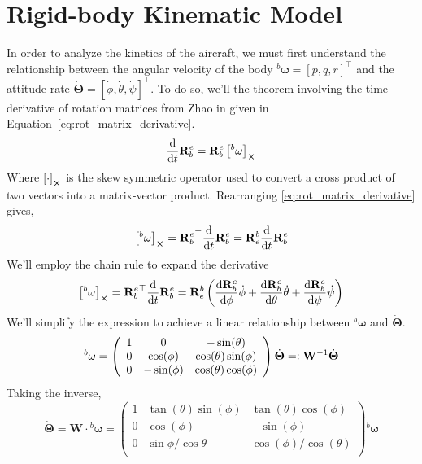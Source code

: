 \documentclass{article}
\begin{document}
	\section*{Rigid-body Kinematic Model}
		In order to analyze the kinetics of the aircraft, we must first understand the relationship between the angular velocity of the body ${}^b\mathbf{\omega} = \left[p,q, r\right]^\top$ and the  attitude rate $\dot{\mathbf{\Theta}} = \left[\dot{\phi}, \dot{\theta}, \dot{\psi}\right]^\top$. To do so, we'll the theorem involving the time derivative of rotation matrices from Zhao in \cite{zhaoTimeDerivativeRotation2016} given in Equation~\ref{eq:rot_matrix_derivative}.  
		\begin{equation}
			\dv{}{t}{\mathbf{R}_b^e} = \mathbf{R}_b^e \left[{}^b \mathbf{\omega}\right]_{\cross}
			\label{eq:rot_matrix_derivative}
		\end{equation}
		Where $\left[\cdot\right]_{\cross}$ is the skew symmetric operator used to convert a cross product of two vectors into a matrix-vector product.  Rearranging \ref{eq:rot_matrix_derivative} gives,
		\begin{equation}
			\left[{}^b \mathbf{\omega}\right]_{\cross} = {\mathbf{R}_b^e}^\top \dv{}{t}{\mathbf{R}_b^e} = {\mathbf{R}_e^b} \dv{}{t}{\mathbf{R}_b^e}
		\end{equation}
		We'll employ the chain rule to expand the derivative
		\begin{equation}
			\left[{}^b \mathbf{\omega}\right]_{\cross} = {\mathbf{R}_b^e}^\top \dv{}{t}{\mathbf{R}_b^e} = {\mathbf{R}_e^b} \left(\dv{\mathbf{R}_b^e}{\phi}\dot{\phi} + \dv{\mathbf{R}_b^e}{\theta}\dot{\theta} + \dv{\mathbf{R}_b^e}{\psi}\dot{\psi}\right)
		\end{equation}
		We'll simplify the expression to achieve a linear relationship between ${}^b \mathbf{\omega}$ and $\dot{\mathbf{\Theta}}$.   
		\begin{equation}
			{}^b\mathbf{\omega} = 
			\left(
			\begin{array}{ccc}
				1 & 0 & -\sin(\theta) \\	
				0 & \cos (\phi ) & \cos(\theta)\sin (\phi ) \\
				0 & -\sin (\phi ) & \cos(\theta)\cos (\phi ) \\
			\end{array}
			\right) \dot{\mathbf{\Theta}} =\vcentcolon \mathbf{W}^{-1} \dot{\mathbf{\Theta}}
		\end{equation}
		Taking the inverse,
		\begin{equation}
			\dot{\mathbf{\Theta}} =\mathbf{W}\cdot{}^b\mathbf{\omega} = \left(
			\begin{array}{ccc}
				1 & \tan (\theta ) \sin (\phi ) & \tan (\theta ) \cos (\phi ) \\
				0 & \cos (\phi ) & -\sin (\phi ) \\
				0 & \sin{\phi}/\cos{\theta} & \cos (\phi ) / \cos (\theta ) \\
			\end{array}
			\right)
			{}^b\mathbf{\omega}
		\end{equation}
\end{document}
